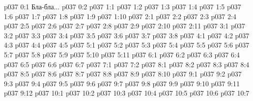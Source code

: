 \author{Яркая Вечерняя Звезда}
\vs p037 0:1  Бла-бла...
\vs p037 0:2 
\vs p037 1:1 
\vs p037 1:2 
\vs p037 1:3 
\vs p037 1:4 
\vs p037 1:5 
\vs p037 1:6 
\vs p037 1:7 
\vs p037 1:8 
\vs p037 1:9 \pc 
\vs p037 1:10 
\vs p037 2:1 
\vs p037 2:2 
\vs p037 2:3 
\vs p037 2:4 \pc 
\vs p037 2:5 
\vs p037 2:6 \pc 
\vs p037 2:7 
\vs p037 2:8 
\vs p037 2:9 
\vs p037 2:10 \pc 
\vs p037 2:11 
\vs p037 3:1 
\vs p037 3:2 
\vs p037 3:3 \pc 
\vs p037 3:4 
\vs p037 3:5 \pc 
\vs p037 3:6 
\vs p037 3:7 \pc 
\vs p037 3:8 
\vs p037 4:1 
\vs p037 4:2 
\vs p037 4:3 
\vs p037 4:4 
\vs p037 4:5 
\vs p037 5:1 
\vs p037 5:2 
\vs p037 5:3 
\vs p037 5:4 \pc 
\vs p037 5:5 
\vs p037 5:6 
\vs p037 5:7 
\vs p037 5:8 
\vs p037 5:9 
\vs p037 5:10 \pc 
\vs p037 5:11 
\vs p037 6:1 
\vs p037 6:2 
\vs p037 6:3 \pc 
\vs p037 6:4 
\vs p037 6:5 \pc 
\vs p037 6:6 
\vs p037 6:7 \pc 
{}
\vs p037 7:1 
\vs p037 7:2 
\vs p037 8:1 
\vs p037 8:2 \pc 
\vs p037 8:3 
\vs p037 8:4 
\vs p037 8:5 
\vs p037 8:6 
\vs p037 8:7 
\vs p037 8:8 
\vs p037 8:9 
\vs p037 8:10 \pc 
{}
\vs p037 9:1 
\vs p037 9:2 
\vs p037 9:3 
\vs p037 9:4 
\vs p037 9:5 
\vs p037 9:6 \pc 
\vs p037 9:7 \pc 
\vs p037 9:8 \pc 
\vs p037 9:9 \pc 
\vs p037 9:10 
\vs p037 9:11 \pc 
\vs p037 9:12 \pc 
{}
\vs p037 10:1 
\vs p037 10:2 \pc 
\vs p037 10:3 \pc 
\vs p037 10:4 \pc 
\vs p037 10:5 
\vs p037 10:6 
\vsetoff
\vs p037 10:7 
\quizlink
